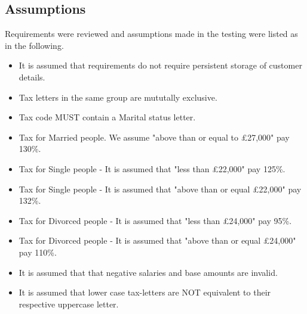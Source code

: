 \subsection{Assumptions}
Requirements were reviewed and assumptions made in the testing were listed as in the following.
\begin{itemize}
    \item It is assumed that requirements do not require persistent storage of customer details.
    \item Tax letters in the same group are mututally exclusive. 
    \item Tax code MUST contain a Marital status letter. 
    \item Tax for Married people. We assume "above than or equal to £27,000" pay 130\%. 
    \item Tax for Single people - It is assumed that "less than £22,000" pay 125\%. 
    \item Tax for Single people - It is assumed that "above than or equal £22,000" pay 132\%. 
    \item Tax for Divorced people - It is assumed that "less than £24,000" pay 95\%.
    \item Tax for Divorced people - It is assumed that "above than or equal £24,000" pay 110\%.
    \item It is assumed that that negative salaries and base amounts are invalid.
    \item It is assumed that lower case tax-letters are NOT equivalent to their respective uppercase letter. 
\end{itemize}